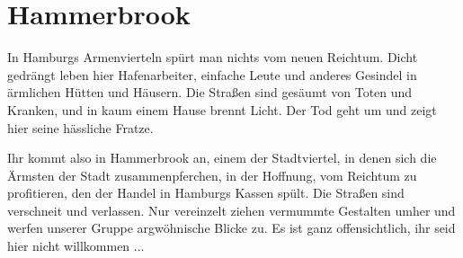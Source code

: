 
\chapter{Hammerbrook}
\label{chap:hammerbrook}

\begin{advquote}
\large In Hamburgs Armenvierteln spürt man nichts vom neuen Reichtum. Dicht gedrängt
leben hier Hafenarbeiter, einfache Leute und anderes Gesindel in ärmlichen Hütten
und Häusern. Die Straßen sind gesäumt von Toten und Kranken, und in kaum einem Hause
brennt Licht. Der Tod geht um und zeigt hier seine hässliche Fratze.

Ihr kommt also in Hammerbrook an, einem der Stadtviertel, in denen sich die Ärmsten
der Stadt zusammenpferchen, in der Hoffnung, vom Reichtum zu profitieren, den der
Handel in Hamburgs Kassen spült. Die Straßen sind verschneit und verlassen. Nur
vereinzelt ziehen vermummte Gestalten umher und werfen unserer Gruppe argwöhnische
Blicke zu. Es ist ganz offensichtlich, ihr seid hier nicht willkommen ...
\end{advquote}
